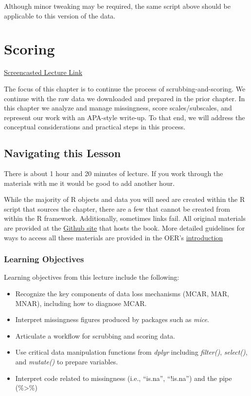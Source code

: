 \documentclass[
  11pt,
]{book}
\providecommand{\tightlist}{%
  \setlength{\itemsep}{0pt}\setlength{\parskip}{0pt}}
\begin{document}
Although minor tweaking may be required, the same script above should be applicable to this version of the data.

\hypertarget{score}{%
\chapter{Scoring}\label{score}}

\href{https://spu.hosted.panopto.com/Panopto/Pages/Viewer.aspx?pid=18a6be07-5bdc-404d-bc95-acf601830887}{Screencasted Lecture Link}

The focus of this chapter is to continue the process of scrubbing-and-scoring. We continue with the raw data we downloaded and prepared in the prior chapter. In this chapter we analyze and manage missingness, score scales/subscales, and represent our work with an APA-style write-up. To that end, we will address the conceptual considerations and practical steps in this process.

\hypertarget{navigating-this-lesson-1}{%
\section{Navigating this Lesson}\label{navigating-this-lesson-1}}

There is about 1 hour and 20 minutes of lecture. If you work through the materials with me it would be good to add another hour.

While the majority of R objects and data you will need are created within the R script that sources the chapter, there are a few that cannot be created from within the R framework. Additionally, sometimes links fail. All original materials are provided at the \href{https://github.com/lhbikos/ReC_MultivModel}{Github site} that hosts the book. More detailed guidelines for ways to access all these materials are provided in the OER's \protect\hyperlink{ReCintro}{introduction}

\hypertarget{learning-objectives-1}{%
\subsection{Learning Objectives}\label{learning-objectives-1}}

Learning objectives from this lecture include the following:

\begin{itemize}
\tightlist
\item
  Recognize the key components of data loss mechanisms (MCAR, MAR, MNAR), including how to diagnose MCAR.
\item
  Interpret missingness figures produced by packages such as \emph{mice}.
\item
  Articulate a workflow for scrubbing and scoring data.
\item
  Use critical data manipulation functions from \emph{dplyr} including \emph{filter()}, \emph{select()}, and \emph{mutate()} to prepare variables.
\item
  Interpret code related to missingness (i.e., ``is.na'', ``!is.na'') and the pipe (\%\textgreater\%)
\end{itemize}
\end{document}
